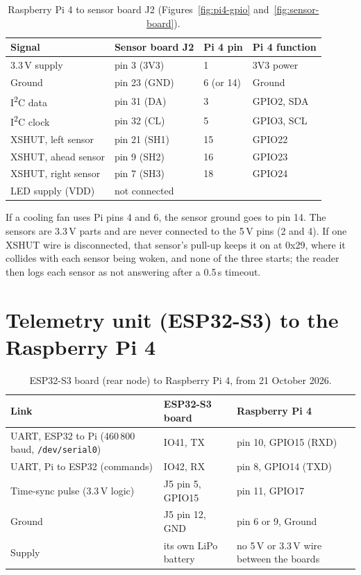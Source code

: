 \begin{table}[htbp]
\centering
\caption[Raspberry Pi 4 to sensor board J2 (Figures~\ref{fig:pi4-gpio} and~\ref{fig:sensor-board})]{Raspberry Pi 4 to sensor board J2 (Figures~\ref{fig:pi4-gpio} and~\ref{fig:sensor-board}).}
\label{tab:wiring-tof}
\begin{tabular}{|l|l|l|l|}
\hline
\textbf{Signal} & \textbf{Sensor board J2} & \textbf{Pi 4 pin} & \textbf{Pi 4 function} \\ \hline
3.3\,V supply & pin 3 (3V3) & 1 & 3V3 power \\ \hline
Ground & pin 23 (GND) & 6 (or 14) & Ground \\ \hline
I\textsuperscript{2}C data & pin 31 (DA) & 3 & GPIO2, SDA \\ \hline
I\textsuperscript{2}C clock & pin 32 (CL) & 5 & GPIO3, SCL \\ \hline
XSHUT, left sensor & pin 21 (SH1) & 15 & GPIO22 \\ \hline
XSHUT, ahead sensor & pin 9 (SH2) & 16 & GPIO23 \\ \hline
XSHUT, right sensor & pin 7 (SH3) & 18 & GPIO24 \\ \hline
LED supply (VDD) & not connected & & \\ \hline
\end{tabular}
\end{table}

If a cooling fan uses Pi pins 4 and 6, the sensor ground goes to pin 14. The sensors are 3.3\,V parts and are never connected to the 5\,V pins (2 and 4). If one XSHUT wire is disconnected, that sensor's pull-up keeps it on at 0x29, where it collides with each sensor being woken, and none of the three starts; the reader then logs each sensor as not answering after a 0.5\,s timeout.

\section{Telemetry unit (ESP32-S3) to the Raspberry Pi 4}

\begin{table}[htbp]
\centering
\caption[ESP32-S3 board (rear node) to Raspberry Pi 4, from 21 October 2026]{ESP32-S3 board (rear node) to Raspberry Pi 4, from 21 October 2026.}
\label{tab:wiring-esp-pi}
\begin{tabular}{|p{3.6cm}|p{4.2cm}|p{4.2cm}|}
\hline
\textbf{Link} & \textbf{ESP32-S3 board} & \textbf{Raspberry Pi 4} \\ \hline
UART, ESP32 to Pi (460\,800\,baud, \texttt{/dev/serial0}) & IO41, TX & pin 10, GPIO15 (RXD) \\ \hline
UART, Pi to ESP32 (commands) & IO42, RX & pin 8, GPIO14 (TXD) \\ \hline
Time-sync pulse (3.3\,V logic) & J5 pin 5, GPIO15 & pin 11, GPIO17 \\ \hline
Ground & J5 pin 12, GND & pin 6 or 9, Ground \\ \hline
Supply & its own LiPo battery & no 5\,V or 3.3\,V wire between the boards \\ \hline
\end{tabular}
\end{table}

